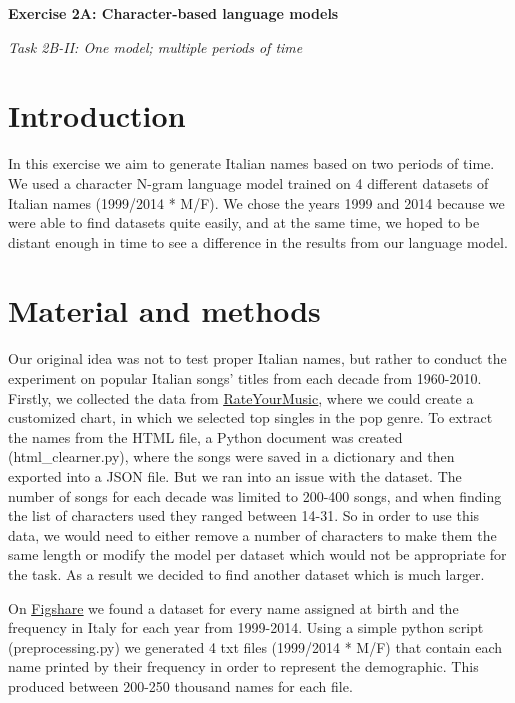 \begin{flushleft}
    {\fontsize{16}{18}\selectfont\textbf{Exercise 2A: Character-based language models}} 

    \bigskip

    {\fontsize{14}{16}\selectfont \textit{Task 2B-II: One model; multiple periods of time}}
\end{flushleft}

\section*{Introduction}
In this exercise we aim to generate Italian names based on two periods of time. We used a character N-gram language model trained on 4 different datasets of Italian names (1999/2014 * M/F). We chose the years 1999 and 2014 because we were able to find datasets quite easily, and at the same time, we hoped to be distant enough in time to see a difference in the results from our language model.

\section*{Material and methods}
Our original idea was not to test proper Italian names, but rather to conduct the experiment on popular Italian songs' titles from each decade from 1960-2010. Firstly, we collected the data from \href{https://rateyourmusic.com/}{\underline{RateYourMusic}}, where we could create a customized chart, in which we selected top singles in the pop genre. To extract the names from the HTML file, a Python document was created (html\_clearner.py), where the songs were saved in a dictionary and then exported into a JSON file. But we ran into an issue with the dataset. The number of songs for each decade was limited to 200-400 songs, and when finding the list of characters used they ranged between 14-31. So in order to use this data, we would need to either remove a number of characters to make them the same length or modify the model per dataset which would not be appropriate for the task. As a result we decided to find another dataset which is much larger. 

On \href{https://figshare.com/articles/dataset/italian_names_first_5000_xlsx/3839580}{\underline{Figshare}} we found a dataset for every name assigned at birth and the frequency in Italy for each year from 1999-2014. Using a simple python script (preprocessing.py) we generated 4 txt files (1999/2014 * M/F) that contain each name printed by their frequency in order to represent the demographic. This produced between 200-250 thousand names for each file.


